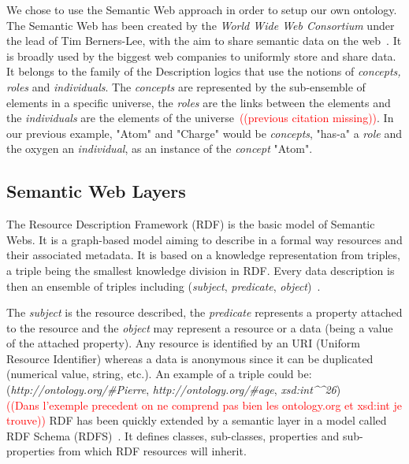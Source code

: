 \documentclass{vgtc}                          %
\newcommand*\mvb[1]{\textcolor{red}{#1}}
\begin{document}
We chose to use the Semantic Web approach in order to setup our own ontology. 
The Semantic Web has been created by the \textit{World Wide Web Consortium} under the lead of Tim Berners-Lee, with the aim to share semantic data on the web~\cite{berners2001semantic}. It is broadly used by the biggest web companies to uniformly store and share data. It belongs to the family of the Description logics that use the notions of \textit{concepts, roles} and \textit{individuals}. 
The \textit{concepts} are represented by the sub-ensemble of elements in a specific universe, the \textit{roles} are the links between the elements and the \textit{individuals} are the elements of the universe~\cite{}\mvb{((previous citation missing))}. In our previous example, "Atom" and "Charge" would be \textit{concepts}, "has-a" a \textit{role} and the oxygen an \textit{individual}, as an instance of the \textit{concept} "Atom".

\subsection{Semantic Web Layers}

The Resource Description Framework (RDF) is the basic model of Semantic Webs. It is a graph-based model aiming to describe in a formal way resources and their associated metadata. It is based on a knowledge representation from triples, a triple being the smallest knowledge division in RDF. Every data description is then an ensemble of triples including (\textit{subject}, \textit{predicate}, \textit{object})~\cite{godel1999bach}.

The \textit{subject} is the resource described, the \textit{predicate} represents a property attached to the resource and the \textit{object} may represent a resource or a data (being a value of the attached property). Any resource is identified by an URI (Uniform Resource Identifier) whereas a data is anonymous since it can be duplicated (numerical value, string, etc.). An example of a triple could be:
\\
(\textit{http://ontology.org/\#Pierre}, \textit{http://ontology.org/\#age}, \textit{xsd:int\^{}\^{}26})
\\
\mvb{((Dans l'exemple precedent on ne comprend pas bien les ontology.org et xsd:int je trouve))}
RDF has been quickly extended by a semantic layer in a model called RDF Schema (RDFS)~\cite{brickley2004rdf}. It defines classes, sub-classes, properties and sub-properties from which RDF resources will inherit. 
\end{document}
